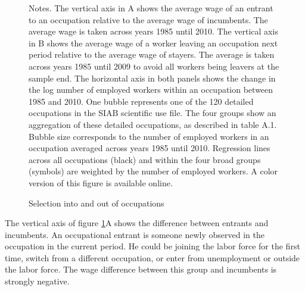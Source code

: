\documentclass[12pt]{article}
\theoremstyle{definition}
\begin{document}
\begin{figure}[H]
    \noindent\caption{Selection into and out of occupations}
    \begin{center}
        \label{bohmOccupationGrowthSkill2024_fig3}
    \end{center}
    \vspace{-20pt}
    {\footnotesize Notes. The vertical axis in A shows the average wage of an entrant to an occupation relative to the average wage of incumbents. The average wage is taken across years 1985 until 2010. The vertical axis in B shows the average wage of a worker leaving an occupation next period relative to the average wage of stayers. The average is taken across years 1985 until 2009 to avoid all workers being leavers at the sample end. The horizontal axis in both panels shows the change in the log number of employed workers within an occupation between 1985 and 2010. One bubble represents one of the 120 detailed occupations in the SIAB scientific use file. The four groups show an aggregation of these detailed occupations, as described in table A.1. Bubble size corresponds to the number of employed workers in an occupation averaged across years 1985 until 2010. Regression lines across all occupations (black) and within the four broad groups (symbols) are weighted by the number of employed workers. A color version of this figure is available online.}
\end{figure}

The vertical axis of figure \ref{bohmOccupationGrowthSkill2024_fig3}A shows the difference between entrants and incumbents. An occupational entrant is someone newly observed in the occupation in the current period. He could be joining the labor force for the first time, switch from a different occupation, or enter from unemployment or outside the labor force. The wage difference between this group and incumbents is strongly negative.
\end{document}
